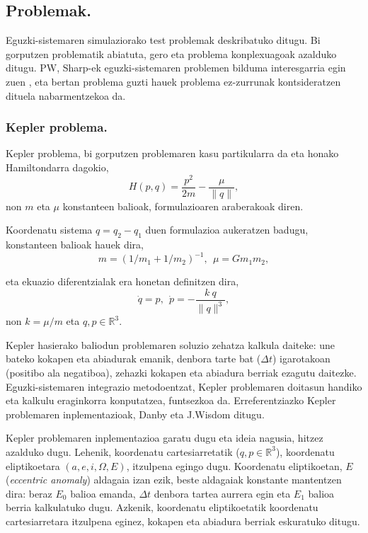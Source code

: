 \subsection{Problemak.}
\label{ss:342}

Eguzki-sistemaren simulaziorako test problemak deskribatuko ditugu. Bi gorputzen problematik abiatuta, gero eta problema konplexuagoak azalduko ditugu. PW, Sharp-ek \cite{Sharp2001} eguzki-sistemaren problemen bilduma interesgarria egin zuen , eta bertan problema guzti hauek problema ez-zurrunak kontsideratzen dituela nabarmentzekoa da.      

\subsubsection*{Kepler problema.}
\label{ss:keplerproblem}

Kepler problema, bi gorputzen problemaren kasu partikularra da eta  honako Hamiltondarra dagokio,
\begin{equation}
H(p,q)=\frac{p^2}{2m}-\frac{\mu}{\|q\|},
\end{equation}
non $m$ eta $\mu$ konstanteen balioak, formulazioaren araberakoak diren.

Koordenatu sistema $q=q_2-q_1$ duen formulazioa aukeratzen badugu, konstanteen balioak hauek dira,  
\begin{equation*}
m=(1/m_1+1/m_2)^{-1},\ \ \mu=Gm_1m_2,
\end{equation*} 

eta ekuazio diferentzialak era honetan definitzen dira,
\begin{equation}
\dot{q}=p, \ \ \dot{p}= - \frac{k \ q}{\|q\|^3} ,
\end{equation}
non $k= \mu / m$ eta  $q,p \in \mathbb{R}^3$.

Kepler hasierako baliodun problemaren soluzio zehatza kalkula daiteke: une bateko kokapen eta abiadurak emanik, denbora tarte bat ($\Delta t$) igarotakoan (positibo ala negatiboa), zehazki kokapen eta abiadura berriak ezagutu daitezke. Eguzki-sistemaren integrazio metodoentzat, Kepler problemaren doitasun handiko eta kalkulu eraginkorra konputatzea, funtsezkoa da. Erreferentziazko Kepler problemaren inplementazioak, Danby \cite{Danby1992} eta J.Wisdom  \cite{Wisdom2015} ditugu. 

Kepler problemaren inplementazioa garatu dugu eta ideia nagusia, hitzez azalduko dugu. Lehenik, koordenatu cartesiarretatik ($q,p\in \mathbb{R}^3$), koordenatu eliptikoetara $(a,e,i,\Omega,E)$, itzulpena egingo dugu. Koordenatu eliptikoetan, $E$ (\emph{eccentric anomaly}) aldagaia izan ezik, beste aldagaiak konstante mantentzen dira: beraz $E_0$ balioa emanda, $\Delta t$ denbora tartea aurrera egin eta $E_1$ balioa berria kalkulatuko dugu. Azkenik, koordenatu eliptikoetatik koordenatu cartesiarretara itzulpena eginez, kokapen eta abiadura berriak eskuratuko ditugu. 

